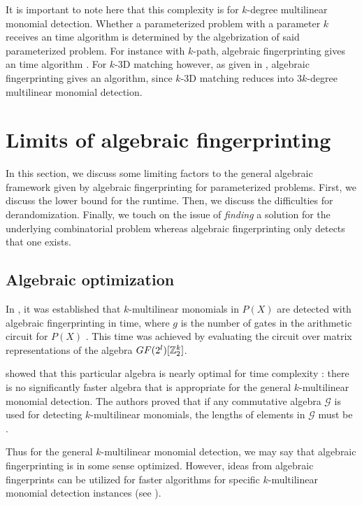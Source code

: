 It is important to note here that this complexity is for $k$-degree 
multilinear monomial detection. Whether a parameterized problem with a parameter 
$k$ receives an  time algorithm is determined by the algebrization 
of said parameterized problem. 
For instance with $k$-path, algebraic fingerprinting gives an  
time algorithm \cite{Williams09}. 
For $k$-3D matching however, as given in , 
algebraic fingerprinting gives an  algorithm, since 
$k$-3D matching reduces into $3k$-degree multilinear monomial detection.


\section{Limits of algebraic fingerprinting}
\label{sect:limits}

In this section, we discuss some limiting factors to the general 
algebraic framework given by 
algebraic fingerprinting for parameterized problems. First, 
we discuss the lower bound for the runtime. Then, we discuss 
the difficulties for derandomization. Finally, we touch on the issue of 
\emph{finding} a solution for the underlying combinatorial problem 
whereas algebraic fingerprinting only detects that one exists.

\subsection{Algebraic optimization}
\label{sect:algebra_is_optimal}

In , it was established that $k$-multilinear monomials 
in $P(X)$ are detected with 
algebraic fingerprinting in  time, where 
$g$ is the number of gates in the arithmetic circuit for $P(X)$ \cite{Williams09}. 
This time was achieved by evaluating the circuit over matrix 
representations of the algebra $GF(2^l)[\mathbb Z_2^k]$.

\citeauthor{KouWil09} showed that this particular algebra is nearly optimal 
for time complexity \cite{KouWil09}: there is no significantly faster algebra that 
is appropriate for the general $k$-multilinear monomial detection. 
The authors proved that if any commutative algebra $\mathcal{G}$ is 
used for detecting $k$-multilinear monomials, 
the lengths of elements in $\mathcal{G}$ must be .

Thus for the general $k$-multilinear monomial detection, we may say 
that algebraic fingerprinting is in some sense optimized. 
However, 
ideas from algebraic fingerprints can be utilized for faster algorithms for 
specific $k$-multilinear monomial detection instances (see ).

